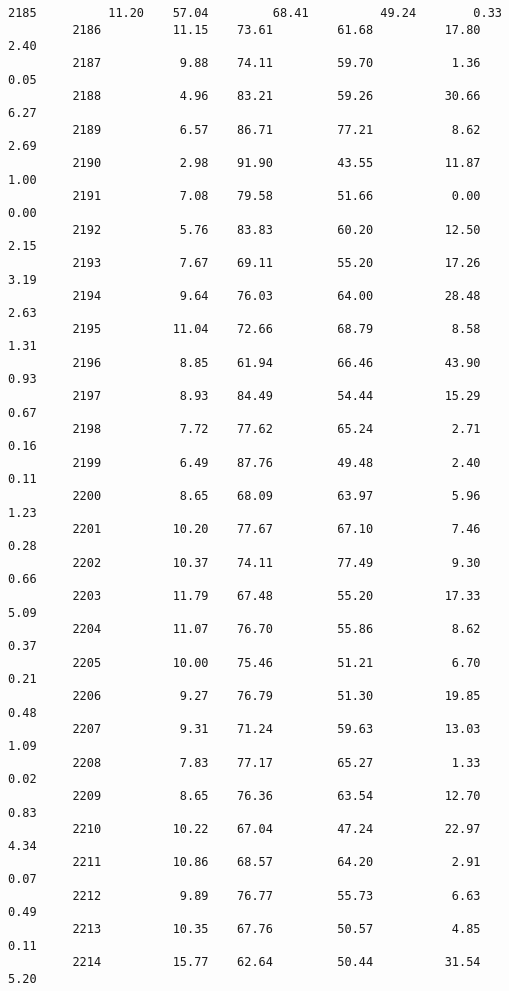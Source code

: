\documentclass[11pt]{llncs}
\begin{document}
\begin{Verbatim}[commandchars=\\\{\}]
         2185          11.20    57.04         68.41          49.24        0.33   
         2186          11.15    73.61         61.68          17.80        2.40   
         2187           9.88    74.11         59.70           1.36        0.05   
         2188           4.96    83.21         59.26          30.66        6.27   
         2189           6.57    86.71         77.21           8.62        2.69   
         2190           2.98    91.90         43.55          11.87        1.00   
         2191           7.08    79.58         51.66           0.00        0.00   
         2192           5.76    83.83         60.20          12.50        2.15   
         2193           7.67    69.11         55.20          17.26        3.19   
         2194           9.64    76.03         64.00          28.48        2.63   
         2195          11.04    72.66         68.79           8.58        1.31   
         2196           8.85    61.94         66.46          43.90        0.93   
         2197           8.93    84.49         54.44          15.29        0.67   
         2198           7.72    77.62         65.24           2.71        0.16   
         2199           6.49    87.76         49.48           2.40        0.11   
         2200           8.65    68.09         63.97           5.96        1.23   
         2201          10.20    77.67         67.10           7.46        0.28   
         2202          10.37    74.11         77.49           9.30        0.66   
         2203          11.79    67.48         55.20          17.33        5.09   
         2204          11.07    76.70         55.86           8.62        0.37   
         2205          10.00    75.46         51.21           6.70        0.21   
         2206           9.27    76.79         51.30          19.85        0.48   
         2207           9.31    71.24         59.63          13.03        1.09   
         2208           7.83    77.17         65.27           1.33        0.02   
         2209           8.65    76.36         63.54          12.70        0.83   
         2210          10.22    67.04         47.24          22.97        4.34   
         2211          10.86    68.57         64.20           2.91        0.07   
         2212           9.89    76.77         55.73           6.63        0.49   
         2213          10.35    67.76         50.57           4.85        0.11   
         2214          15.77    62.64         50.44          31.54        5.20   
         

\end{Verbatim}
\end{document}
